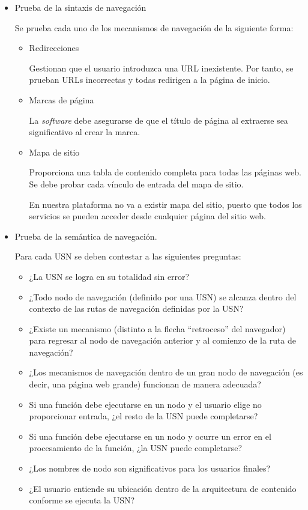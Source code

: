 \begin{itemize}
\item Prueba de la sintaxis de navegación



Se prueba cada uno de los mecanismos de navegación de la siguiente forma:


\begin{itemize}
\item Redirecciones


Gestionan que el usuario introduzca una URL inexistente.  Por tanto, se prueban URLs incorrectas y todas redirigen a la página de inicio.

\item Marcas de página


La \textit{software} debe asegurarse de que el título de página al extraerse sea significativo al crear la marca.

\item Mapa de sitio


Proporciona una tabla de contenido completa para todas las páginas web. Se debe probar cada vínculo de entrada del mapa de sitio.



En nuestra plataforma no va a existir mapa del sitio, puesto que todos los servicios se pueden acceder desde cualquier página del sitio web.


\end{itemize}

\item Prueba de la semántica de navegación.


Para cada USN se deben contestar a las siguientes preguntas:


\begin{itemize}

\item ¿La USN se logra en su totalidad sin error? 
\item ¿Todo nodo de navegación (definido por una USN) se alcanza dentro del contexto de las rutas de navegación definidas por la USN? 
\item ¿Existe un mecanismo (distinto a la flecha ``retroceso'' del navegador) para regresar al nodo de navegación anterior y al comienzo de la ruta de navegación? 
\item ¿Los mecanismos de navegación dentro de un gran nodo de navegación (es decir, una página web grande) funcionan de manera adecuada? 
\item Si una función debe ejecutarse en un nodo y el usuario elige no proporcionar entrada, ¿el resto de la USN puede completarse? 
\item Si una función debe ejecutarse en un nodo y ocurre un error en el procesamiento de la función, ¿la USN puede completarse?
\item ¿Los nombres de nodo son significativos para los usuarios finales? 
\item ¿El usuario entiende su ubicación dentro de la arquitectura de contenido conforme se ejecuta la USN?
\end{itemize}
\end{itemize}

